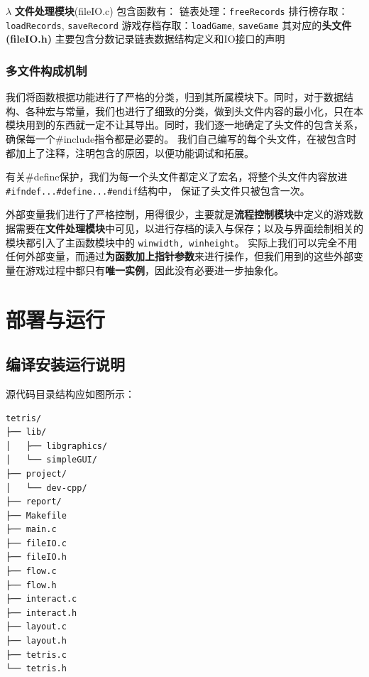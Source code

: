 \documentclass{style/ucasproposal}
\newcommand{\cinline}[1]{\texttt{#1}}
\begin{document}
$\lambda$\newline
\textbf{文件处理模块}(fileIO.c) 包含函数有：\newline
链表处理：\cinline{freeRecords}\newline
排行榜存取：\cinline{loadRecords}, \cinline{saveRecord}\newline
游戏存档存取：\cinline{loadGame}, \cinline{saveGame}\newline
其对应的\textbf{头文件(fileIO.h)} 主要包含分数记录链表数据结构定义和IO接口的声明

\subsubsection{多文件构成机制}
我们将函数根据功能进行了严格的分类，归到其所属模块下。同时，对于数据结构、各种宏与常量，我们也进行了细致的分类，做到头文件内容的最小化，只在本模块用到的东西就一定不让其导出。同时，我们逐一地确定了头文件的包含关系，确保每一个\#include指令都是必要的。
我们自己编写的每个头文件，在被包含时都加上了注释，注明包含的原因，以便功能调试和拓展。

有关\#define保护，我们为每一个头文件都定义了宏名，将整个头文件内容放进
\texttt{#ifndef...#define...#endif}结构中，
保证了头文件只被包含一次。

外部变量我们进行了严格控制，用得很少，主要就是\textbf{流程控制模块}中定义的游戏数据需要在\textbf{文件处理模块}中可见，以进行存档的读入与保存；以及与界面绘制相关的模块都引入了主函数模块中的 \cinline{winwidth, winheight}。
实际上我们可以完全不用任何外部变量，而通过\textbf{为函数加上指针参数}来进行操作，但我们用到的这些外部变量在游戏过程中都只有\textbf{唯一实例}，因此没有必要进一步抽象化。



\section{部署与运行}
\subsection{编译安装运行说明}
源代码目录结构应如图所示：
\begin{verbatim}
tetris/
├── lib/
│   ├── libgraphics/
│   └── simpleGUI/
├── project/
│   └── dev-cpp/
├── report/
├── Makefile
├── main.c
├── fileIO.c
├── fileIO.h
├── flow.c
├── flow.h
├── interact.c
├── interact.h
├── layout.c
├── layout.h
├── tetris.c
└── tetris.h
\end{verbatim}
\end{document}
